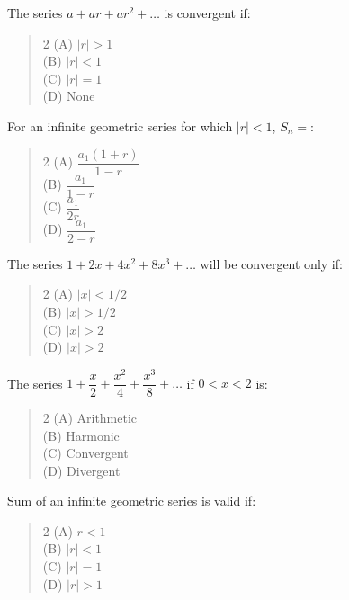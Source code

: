 \documentclass[11pt,a4paper]{article}
\begin{document}
\begin{mcqlist}
\item The series $a+ar+ar^2+\ldots$ is convergent if:
\begin{quote}\begin{multicols}{2}
\noindent (A) $|r|>1$ \\
(B) $|r|<1$ \\
(C) $|r|=1$ \\
(D) None
\end{multicols}\end{quote}

\item For an infinite geometric series for which $|r|<1$, $S_n=$:
\begin{quote}\begin{multicols}{2}
\noindent (A) $\dfrac{a_1(1+r)}{1-r}$ \\
(B) $\dfrac{a_1}{1-r}$ \\
(C) $\dfrac{a_1}{2r}$ \\
(D) $\dfrac{a_1}{2-r}$
\end{multicols}\end{quote}

\item The series $1+2x+4x^2+8x^3+\ldots$ will be convergent only if:
\begin{quote}\begin{multicols}{2}
\noindent (A) $|x|<1/2$ \\
(B) $|x|>1/2$ \\
(C) $|x|>2$ \\
(D) $|x|>2$
\end{multicols}\end{quote}

\item The series $1+\dfrac{x}{2}+\dfrac{x^2}{4}+\dfrac{x^3}{8}+\ldots$ if $0<x<2$ is:
\begin{quote}\begin{multicols}{2}
\noindent (A) Arithmetic \\
(B) Harmonic \\
(C) Convergent \\
(D) Divergent
\end{multicols}\end{quote}

\item Sum of an infinite geometric series is valid if:
\begin{quote}\begin{multicols}{2}
\noindent (A) $r<1$ \\
(B) $|r|<1$ \\
(C) $|r|=1$ \\
(D) $|r|>1$
\end{multicols}\end{quote}


\end{mcqlist}
\end{document}
